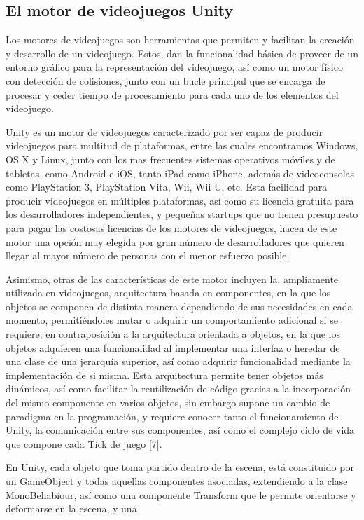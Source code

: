 \subsection{El motor de videojuegos Unity}

Los motores de videojuegos son herramientas que permiten y facilitan la creación y desarrollo de un videojuego. Estos, dan la funcionalidad básica de proveer de un entorno gráfico para la representación del videojuego, así como un motor físico con detección de colisiones, junto con un bucle principal que se encarga de procesar y ceder tiempo de procesamiento para cada uno de los elementos del videojuego.

Unity es un motor de videojuegos caracterizado por ser capaz de producir videojuegos para multitud de plataformas, entre las cuales encontramos Windows, OS X y Linux, junto con los mas frecuentes sistemas operativos móviles y de tabletas, como Android e  iOS, tanto iPad como iPhone, además de videoconsolas como PlayStation 3, PlayStation Vita, Wii, Wii U, etc. Esta facilidad para producir videojuegos en múltiples plataformas, así como su licencia gratuita para los desarrolladores independientes, y pequeñas startups que no tienen presupuesto para pagar las costosas licencias de los motores de videojuegos, hacen de este motor una opción muy elegida por gran número de desarrolladores que quieren llegar al mayor número de personas con el menor esfuerzo posible.

Asimismo, otras de las características de este motor incluyen la, ampliamente utilizada en videojuegos, arquitectura basada en componentes, en la que los objetos se componen de distinta manera dependiendo de sus necesidades en cada momento, permitiéndoles mutar o adquirir un comportamiento adicional si se requiere; en contraposición a la arquitectura orientada a objetos, en la que los objetos adquieren una funcionalidad al implementar una interfaz o heredar de una clase de una jerarquía superior, así como adquirir funcionalidad mediante la implementación de si misma. Esta arquitectura permite tener objetos más dinámicos, así como facilitar la reutilización de código gracias a la incorporación del mismo componente en varios objetos, sin embargo supone un cambio de paradigma en la programación, y requiere conocer tanto el funcionamiento de Unity, la comunicación entre sus componentes, así como el complejo ciclo de vida que compone cada Tick de juego [7].

En Unity, cada objeto que toma partido dentro de la escena, está constituido por un GameObject y todas aquellas componentes asociadas, extendiendo a la clase MonoBehabiour, así como una componente Transform que le permite orientarse y deformarse en la escena, y una

